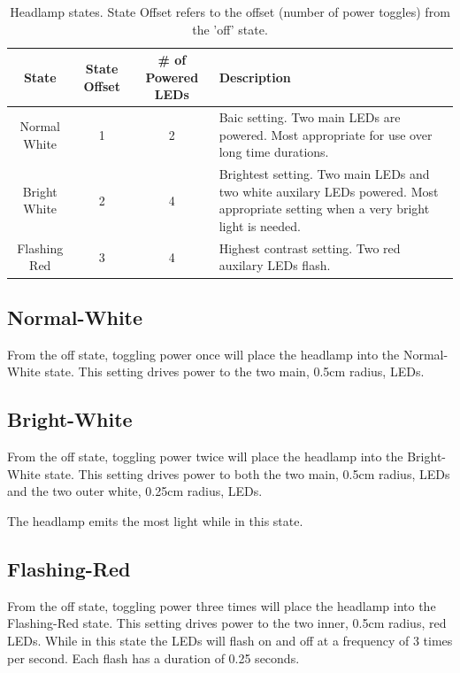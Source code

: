 \documentclass[12pt]{article}
\begin{document}
\begin{table}
\begin{tabular}{ | c | c | c | p{5cm} |}
    \hline
    State & State Offset & \# of Powered LEDs & Description \\ \hline
    Normal White & 1 & 2 &  Baic setting. Two main LEDs are powered. Most appropriate for use over
    long time durations.\\ \hline
    Bright White & 2 & 4 &  Brightest setting. Two main LEDs and two white auxilary LEDs powered.
    Most appropriate setting when a very bright light is needed.\\ \hline
    Flashing Red & 3 & 4 &  Highest contrast setting. Two red auxilary LEDs flash.\\ \hline
\end{tabular}
\caption{Headlamp states. State Offset refers to the offset (number of power toggles) from the 'off' state.}
\end{table}

\subsection{Normal-White}
From the off state, toggling power once will place the headlamp into the Normal-White state.  This
setting drives power to the two main, 0.5cm radius, LEDs.

\subsection{Bright-White}
From the off state, toggling power twice will place the headlamp into the Bright-White state.  This
setting drives power to both the two main, 0.5cm radius, LEDs and the two outer white, 0.25cm radius, LEDs.

The headlamp emits the most light while in this state.

\subsection{Flashing-Red}
From the off state, toggling power three times will place the headlamp into the Flashing-Red state.
This setting drives power to the two inner, 0.5cm radius, red LEDs. While in this state the
LEDs will flash on and off at a frequency of 3 times per second. Each flash has a duration of
0.25 seconds.
\end{document}

